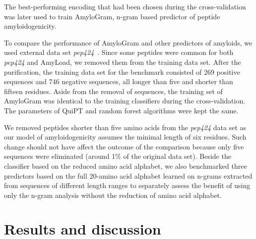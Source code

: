 \documentclass[fleqn,10pt,twoside]{gcb15submission}
\begin{document}
The best-performing encoding that had been chosen during the cross-validation was later used 
%
%
%
%
%
to train AmyloGram, n-gram based predictor of peptide amyloidogenicity.

  To compare the performance of AmyloGram and other predictors of amyloids, we 
used external data set \textit{pep424}~\citep{walsh_pasta_2014}. Since some 
peptides were common for both \textit{pep424} and AmyLoad, we removed them from 
the training data set. After the purification, the training data set for 
%
%
%
the benchmark consisted of 269 positive sequences and 746 negative 
sequences, all longer than five and shorter than fifteen residues. Aside from the 
removal of sequences, the training set of AmyloGram was identical to the training 
%
%
%
classifiers during the cross-validation. The parameters of QuiPT and random forest 
algorithms were kept the same.

  We removed peptides shorter than five amino acids from the \textit{pep424} 
data set as our model of amyloidogenicity assumes the minimal length of six 
residues. Such change should not have affect the outcome of the comparison because 
only five sequences were eliminated (around 1\% of the original data set). 
Beside the classifier based on the reduced amino acid alphabet, we also 
benchmarked three predictors based on the full 20-amino acid alphabet learned on 
n-grams extracted from sequences of different length ranges to separately 
assess the benefit of using only the n-gram analysis without the reduction of 
amino acid alphabet.

\section{Results and discussion}
\end{document}
